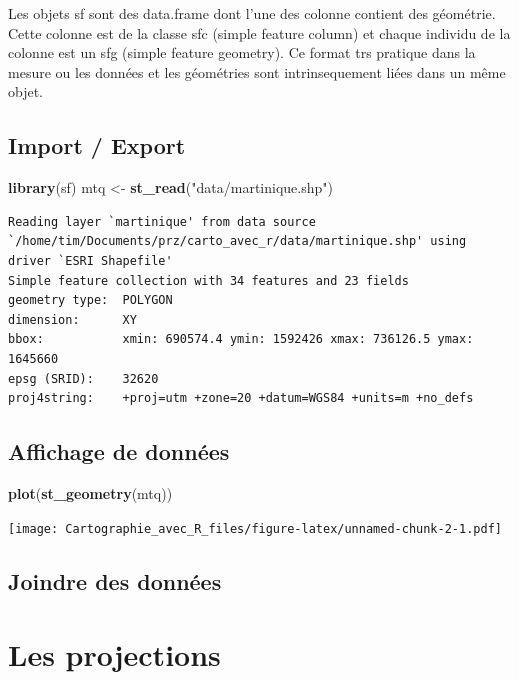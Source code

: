 \documentclass[]{book}
\newenvironment{Shaded}{\begin{snugshade}}{\end{snugshade}}
\newcommand{\KeywordTok}[1]{\textcolor[rgb]{0.13,0.29,0.53}{\textbf{#1}}}
\newcommand{\StringTok}[1]{\textcolor[rgb]{0.31,0.60,0.02}{#1}}
\newcommand{\NormalTok}[1]{#1}
\begin{document}
Les objets sf sont des data.frame dont l'une des colonne contient des
géométrie. Cette colonne est de la classe sfc (simple feature column) et
chaque individu de la colonne est un sfg (simple feature geometry). Ce
format trs pratique dans la mesure ou les données et les géométries sont
intrinsequement liées dans un même objet.

\subsection{Import / Export}\label{import-export}

\begin{Shaded}
\begin{Highlighting}[]
\KeywordTok{library}\NormalTok{(sf)}
\NormalTok{mtq <-}\StringTok{ }\KeywordTok{st_read}\NormalTok{(}\StringTok{"data/martinique.shp"}\NormalTok{)}
\end{Highlighting}
\end{Shaded}

\begin{verbatim}
Reading layer `martinique' from data source `/home/tim/Documents/prz/carto_avec_r/data/martinique.shp' using driver `ESRI Shapefile'
Simple feature collection with 34 features and 23 fields
geometry type:  POLYGON
dimension:      XY
bbox:           xmin: 690574.4 ymin: 1592426 xmax: 736126.5 ymax: 1645660
epsg (SRID):    32620
proj4string:    +proj=utm +zone=20 +datum=WGS84 +units=m +no_defs
\end{verbatim}

\subsection{Affichage de données}\label{affichage-de-donnees}

\begin{Shaded}
\begin{Highlighting}[]
\KeywordTok{plot}\NormalTok{(}\KeywordTok{st_geometry}\NormalTok{(mtq))}
\end{Highlighting}
\end{Shaded}

\texttt{[image: Cartographie\_avec\_R\_files/figure-latex/unnamed-chunk-2-1.pdf]}

\subsection{Joindre des données}\label{joindre-des-donnees}

\section{Les projections}\label{les-projections}
\end{document}
